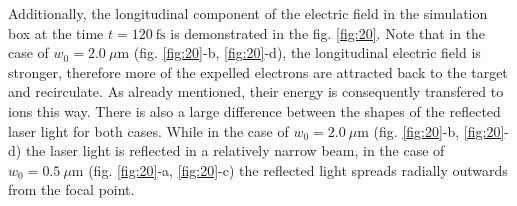 Additionally, the longitudinal component of the electric field in the simulation box at the time $ t = 120 \ \mathrm{fs} $ is demonstrated in the fig. \ref{fig:20}. Note that in the case of $ w_0 = 2.0 \ \mu\mathrm{m} $ (fig. \ref{fig:20}-b, \ref{fig:20}-d), the longitudinal electric field is stronger, therefore more of the expelled electrons are attracted back to the target and recirculate. As already mentioned, their energy is consequently transfered to ions this way. There is also a large difference between the shapes of the reflected laser light for both cases. While in the case of $ w_0 = 2.0 \ \mu\mathrm{m} $ (fig. \ref{fig:20}-b, \ref{fig:20}-d) the laser light is reflected in a relatively narrow beam, in the case of $ w_0 = 0.5 \ \mu\mathrm{m} $ (fig. \ref{fig:20}-a, \ref{fig:20}-c) the reflected light spreads radially outwards from the focal point.

